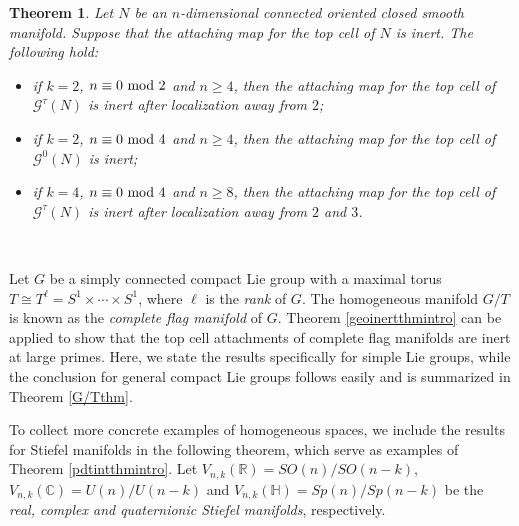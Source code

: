 \documentclass[a4]{amsart}
\newtheorem{theorem}{Theorem}[section]
\theoremstyle{definition}
\begin{document}
\begin{sloppypar}
\begin{theorem}\label{gyration-inert-thmintro} 
Let $N$ be an $n$-dimensional connected oriented closed smooth manifold. 
Suppose that the attaching map for the top cell of $N$ is inert. 
The following hold:
\begin{itemize}
\item[(1).]
if $k=2$, $n\equiv 0~{\rm mod}~2$ and $n\geq 4$, then the attaching map for the top cell of $\mathcal{G}^{\tau}(N)$ is inert after localization away from $2$;
\item[(2).]
if $k=2$, $n\equiv 0~{\rm mod}~4$ and $n\geq 4$, then the attaching map for the top cell of $\mathcal{G}^{0}(N)$ is inert;
\item[(3).] 
if $k=4$, $n\equiv 0~{\rm mod}~4$ and $n\geq 8$, then the attaching map for the top cell of $\mathcal{G}^{\tau}(N)$ is inert after localization away from $2$ and $3$.
\end{itemize}
\end{theorem}


$\, $

Let $G$ be a simply connected compact Lie group with a maximal torus $T\cong T^\ell=S^1\times \cdots \times S^1$, where $\ell$ is the {\it rank} of $G$. The homogeneous manifold $G/T$ is known as the {\it complete flag manifold} of $G$. 
Theorem \ref{geoinertthmintro} can be applied to show that the top cell attachments of complete flag manifolds are inert at large primes. Here, we state the results specifically for simple Lie groups, while the conclusion for general compact Lie groups follows easily and is summarized in Theorem \ref{G/Tthm}.

To collect more concrete examples of homogeneous spaces, we include the results for Stiefel manifolds in the following theorem, which serve as examples of Theorem \ref{pdtintthmintro}. 
Let $V_{n,k}(\mathbb{R})=SO(n)/SO(n-k)$, $V_{n,k}(\mathbb{C})=U(n)/U(n-k)$ and $V_{n,k}(\mathbb{H})=Sp(n)/Sp(n-k)$ be the {\it real, complex and quaternionic Stiefel manifolds}, respectively. 


\end{sloppypar}
\end{document}
